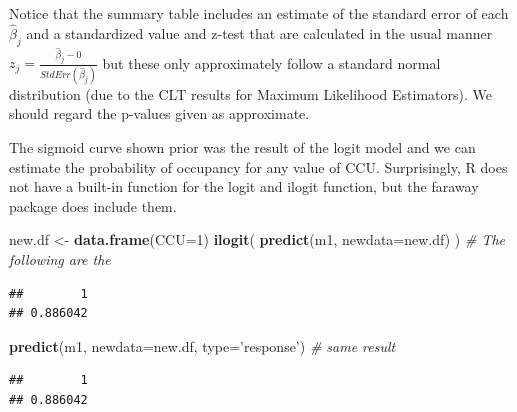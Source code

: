 \documentclass[]{book}
\newenvironment{Shaded}{\begin{snugshade}}{\end{snugshade}}
\newcommand{\KeywordTok}[1]{\textcolor[rgb]{0.13,0.29,0.53}{\textbf{{#1}}}}
\newcommand{\DataTypeTok}[1]{\textcolor[rgb]{0.13,0.29,0.53}{{#1}}}
\newcommand{\DecValTok}[1]{\textcolor[rgb]{0.00,0.00,0.81}{{#1}}}
\newcommand{\StringTok}[1]{\textcolor[rgb]{0.31,0.60,0.02}{{#1}}}
\newcommand{\CommentTok}[1]{\textcolor[rgb]{0.56,0.35,0.01}{\textit{{#1}}}}
\newcommand{\NormalTok}[1]{{#1}}
\theoremstyle{definition}
\theoremstyle{definition}
\theoremstyle{remark}
\begin{document}
Notice that the summary table includes an estimate of the standard error
of each \(\hat{\beta}_{j}\) and a standardized value and z-test that are
calculated in the usual manner
\(z_{j}=\frac{\hat{\beta}_{j}-0}{StdErr\left(\hat{\beta}_{j}\right)}\)
but these only approximately follow a standard normal distribution (due
to the CLT results for Maximum Likelihood Estimators). We should regard
the p-values given as approximate.

The sigmoid curve shown prior was the result of the logit model and we
can estimate the probability of occupancy for any value of CCU.
Surprisingly, R does not have a built-in function for the logit and
ilogit function, but the faraway package does include them.

\begin{Shaded}
\begin{Highlighting}[]
\NormalTok{new.df <-}\StringTok{ }\KeywordTok{data.frame}\NormalTok{(}\DataTypeTok{CCU=}\DecValTok{1}\NormalTok{)}
\KeywordTok{ilogit}\NormalTok{( }\KeywordTok{predict}\NormalTok{(m1, }\DataTypeTok{newdata=}\NormalTok{new.df) )          }\CommentTok{# The following are the}
\end{Highlighting}
\end{Shaded}

\begin{verbatim}
##        1 
## 0.886042
\end{verbatim}

\begin{Shaded}
\begin{Highlighting}[]
\KeywordTok{predict}\NormalTok{(m1, }\DataTypeTok{newdata=}\NormalTok{new.df, }\DataTypeTok{type=}\StringTok{'response'}\NormalTok{)   }\CommentTok{# same result}
\end{Highlighting}
\end{Shaded}

\begin{verbatim}
##        1 
## 0.886042
\end{verbatim}

\begin{Shaded}
\end{Shaded}
\end{document}
